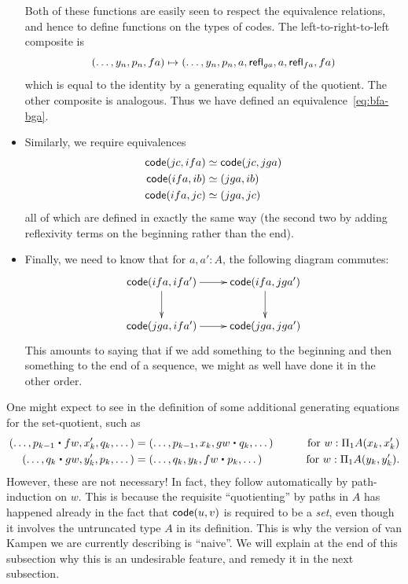 \begin{itemize}
  Both of these functions are easily seen to respect the equivalence relations, and hence to define functions on the types of codes.
  The left-to-right-to-left composite is
  \[ (\dots, y_n, p_n,fa) \mapsto
  (\dots,y_n,p_n,a,\mathsf{refl}_{ga},a,\mathsf{refl}_{fa},fa)
  \]
  which is equal to the identity by a generating equality of the quotient.
  The other composite is analogous.
  Thus we have defined an equivalence~\eqref{eq:bfa-bga}.
\item Similarly, we require equivalences
  \begin{align*}
    \mathsf{code}(jc,ifa) &\simeq \mathsf{code}(jc,jga)\\
    \mathsf{code}(ifa,ib)&\simeq (jga,ib)\\
    \mathsf{code}(ifa,jc)&\simeq (jga,jc)
  \end{align*}
  all of which are defined in exactly the same way (the second two by adding reflexivity terms on the beginning rather than the end).
\item Finally, we need to know that for $a,a':A$, the following diagram commutes:
  \begin{equation}\label{eq:bfa-bga-comm}
  \vcenter{\xymatrix{
      \code(ifa,ifa') \ar[r]\ar[d] &
      \code(ifa,jga')\ar[d]\\
      \code(jga,ifa')\ar[r] &
      \code(jga,jga')
      }}
  \end{equation}
  This amounts to saying that if we add something to the beginning and then something to the end of a sequence, we might as well have done it in the other order.
\end{itemize}

\begin{rmk}\label{rmk:naive}
  One might expect to see in the definition of \code some additional generating equations for the set-quotient, such as
  \begin{alignat*}{2}
    (\dots, p_{k-1} \ct fw, x_{k}', q_{k}, \dots) &=
    (\dots, p_{k-1}, x_{k}, gw \ct q_{k}, \dots)
    & \qquad\text{for } w:\Pi_1A(x_{k},x_{k}')\\
    (\dots, q_k \ct gw, y_k', p_k, \dots) &=
    (\dots, q_k, y_k, fw \ct p_k, \dots)
    & \qquad\text{for } w:\Pi_1A(y_k, y_k').
  \end{alignat*}
  However, these are not necessary!
  In fact, they follow automatically by path-induction on $w$.
  This is because the requisite ``quotienting'' by paths in $A$ has happened already in the fact that $\mathsf{code}(u,v)$ is required to be a \emph{set}, even though it involves the untruncated type $A$ in its definition.
  This is why the version of van Kampen we are currently describing is ``naive''.
  We will explain at the end of this subsection why this is an undesirable feature, and remedy it in the next subsection.
\end{rmk}

